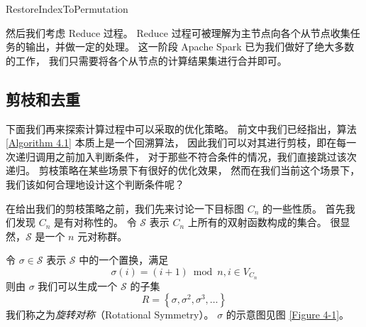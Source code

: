 \begin{algorithm}
\caption{RestoreIndexToPermutation}
\label{Algorithm 4.6}
\begin{algorithmic}[1]
	 
	 
	 

		 
	\EndFor
	\EndFor
\end{algorithmic}
\end{algorithm}

然后我们考虑 Reduce 过程。
Reduce 过程可被理解为主节点向各个从节点收集任务的输出，并做一定的处理。
这一阶段 Apache Spark 已为我们做好了绝大多数的工作，
我们只需要将各个从节点的计算结果集进行合并即可。

\subsection{剪枝和去重}
\label{Subsection 4.3.2}

下面我们再来探索计算过程中可以采取的优化策略。
前文中我们已经指出，算法 \ref{Algorithm 4.1} 本质上是一个回溯算法，
因此我们可以对其进行剪枝，即在每一次递归调用之前加入判断条件，
对于那些不符合条件的情况，我们直接跳过该次递归。
剪枝策略在某些场景下有很好的优化效果，
然而在我们当前这个场景下，我们该如何合理地设计这个判断条件呢？

在给出我们的剪枝策略之前，我们先来讨论一下目标图 $C_n$ 的一些性质。
首先我们发现 $C_n$ 是有对称性的。
令 $\mathcal{S}$ 表示 $C_n$ 上所有的双射函数构成的集合。
很显然，$\mathcal{S}$ 是一个 $n$ 元对称群。

令 $\sigma \in \mathcal{S}$ 表示 $\mathcal{S}$ 中的一个置换，满足
\begin{equation*}
\sigma(i) = (i + 1) \bmod n, i \in V_{C_n}
\end{equation*}
则由 $\sigma$ 我们可以生成一个 $\mathcal{S}$ 的子集
\begin{equation*}
R = \left\{\sigma, \sigma^2, \sigma^3, \dots\right\}
\end{equation*}
我们称之为\emph{旋转对称}（Rotational Symmetry）。
$\sigma$ 的示意图见图 \ref{Figure 4-1}。

